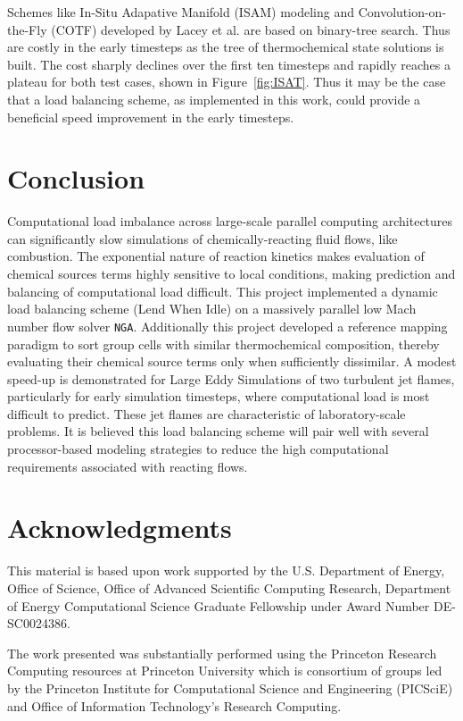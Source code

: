 \documentclass[letterpaper,twocolumn,10pt]{article}
\begin{document}
Schemes like In-Situ Adapative Manifold (ISAM) modeling and Convolution-on-the-Fly (COTF) developed by Lacey et al. \cite{LACEY2021} are based on binary-tree search. Thus are costly in the early timesteps as the tree of thermochemical state solutions is built. The cost sharply declines over the first ten timesteps and rapidly reaches a plateau for both test cases, shown in Figure~\ref{fig:ISAT}. Thus it may be the case that a load balancing scheme, as implemented in this work, could provide a beneficial speed improvement in the early timesteps.

\section{Conclusion}
Computational load imbalance across large-scale parallel computing architectures can significantly slow simulations of chemically-reacting fluid flows, like combustion. The exponential nature of reaction kinetics makes evaluation of chemical sources terms highly sensitive to local conditions, making prediction and balancing of computational load difficult. This project implemented a dynamic load balancing scheme (Lend When Idle) on a massively parallel low Mach number flow solver \texttt{NGA}. Additionally this project developed a reference mapping paradigm to sort group cells with similar thermochemical composition, thereby evaluating their chemical source terms only when sufficiently dissimilar. A modest speed-up is demonstrated for Large Eddy Simulations of two turbulent jet flames, particularly for early simulation timesteps, where computational load is most difficult to predict. These jet flames are characteristic of laboratory-scale problems. It is believed this load balancing scheme will pair well with several processor-based modeling strategies to reduce the high computational requirements associated with reacting flows.

\section{Acknowledgments}
This material is based upon work supported by the U.S. Department of Energy, Office of Science, Office of Advanced Scientific Computing Research, Department of Energy Computational Science Graduate Fellowship under Award Number DE-SC0024386.

The work presented was substantially performed using the Princeton Research Computing resources at Princeton University which is consortium of groups led by the Princeton Institute for Computational Science and Engineering (PICSciE) and Office of Information Technology's Research Computing. 
\end{document}
